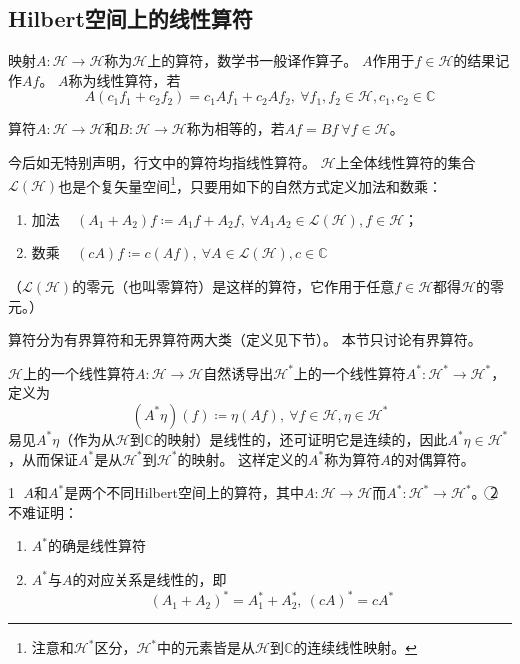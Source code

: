 \subsection{Hilbert空间上的线性算符}

\begin{definition}
    映射$A \colon \mathscr{H} \to \mathscr{H}$称为$\mathscr{H}$上的算符，数学书一般译作算子。
    $A$作用于$f \in \mathscr{H}$的结果记作$Af$。
    $A$称为线性算符，若
    $$A(c_1f_1 + c_2f_2) = c_1Af_1 + c_2Af_2, ~ \forall f_1, f_2 \in \mathscr{H}, c_1, c_2 \in \mathbb{C}$$
\end{definition}

\begin{definition}
    算符$A \colon \mathscr{H} \to \mathscr{H}$和$B \colon \mathscr{H} \to \mathscr{H}$称为相等的，若$Af = Bf ~ \forall f \in \mathscr{H}$。
\end{definition}

今后如无特别声明，行文中的算符均指线性算符。
$\mathscr{H}$上全体线性算符的集合$\mathscr{L}(\mathscr{H})$也是个复矢量空间\footnote{
    注意和$\mathscr{H}^*$区分，$\mathscr{H}^*$中的元素皆是从$\mathscr{H}$到$\mathbb{C}$的连续线性映射。
}，只要用如下的自然方式定义加法和数乘：
\begin{enumerate}[]
    \item 加法 ~ $(A_1 + A_2)f \coloneq A_1f + A_2f, ~ \forall A_1 A_2 \in \mathscr{L}(\mathscr{H}), f \in \mathscr{H}$；
    \item 数乘 ~ $(cA)f \coloneq c(Af), ~ \forall A \in \mathscr{L}(\mathscr{H}), c \in \mathbb{C}$
\end{enumerate}
（$\mathscr{L}(\mathscr{H})$的零元（也叫零算符）是这样的算符，它作用于任意$f \in \mathscr{H}$都得$\mathscr{H}$的零元。）

算符分为有界算符和无界算符两大类（定义见下节）。
本节只讨论有界算符。

\begin{definition}
    $\mathscr{H}$上的一个线性算符$A \colon \mathscr{H} \to \mathscr{H}$自然诱导出$\mathscr{H}^*$上的一个线性算符$A^* \colon \mathscr{H}^* \to \mathscr{H}^*$，定义为
    $$(A^*\eta)(f) \coloneq \eta(Af), ~ \forall f \in \mathscr{H}, \eta \in \mathscr{H}^*$$
    易见$A^*\eta$（作为从$\mathscr{H}$到$\mathbb{C}$的映射）是线性的，还可证明它是连续的，因此$A^*\eta \in \mathscr{H}^*$，从而保证$A^*$是从$\mathscr{H}^*$到$\mathscr{H}^*$的映射。
    这样定义的$A^*$称为算符$A$的对偶算符。
\end{definition}

\begin{note}
    \textcircled{1} $A$和$A^*$是两个不同Hilbert空间上的算符，其中$A \colon \mathscr{H} \to \mathscr{H}$而$A^* \colon \mathscr{H}^* \to \mathscr{H}^*$。
    \textcircled{2} 不难证明：
    \begin{enumerate}[（a）]
        \item $A^*$的确是线性算符
        \item $A^*$与$A$的对应关系是线性的，即
        $$(A_1 + A_2)^* = A_1^* + A_2^*, ~ (cA)^* = cA^*$$
    \end{enumerate}
\end{note}

